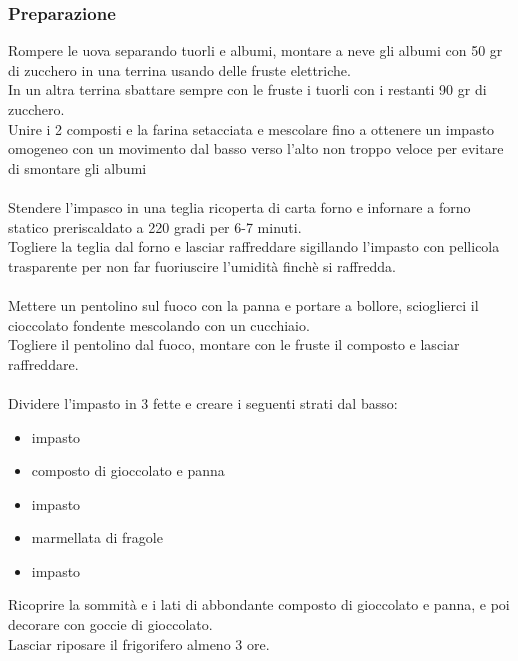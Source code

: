 \documentclass[12pt, a4paper]{article}
\begin{document}
\subsubsection{Preparazione}
	Rompere le uova separando tuorli e albumi, montare a neve gli albumi
	con 50 gr di zucchero in una terrina usando delle fruste elettriche.\\
	In un altra terrina sbattare sempre con le fruste i tuorli con i restanti
	90 gr di zucchero.\\
	Unire i 2 composti e la farina setacciata e mescolare fino a ottenere un impasto
	omogeneo con un movimento dal basso verso l'alto non troppo veloce per evitare di
	smontare gli albumi\\\\
	Stendere l'impasco in una teglia ricoperta di carta forno e infornare a forno statico
	preriscaldato a 220 gradi per 6-7 minuti.\\
	Togliere la teglia dal forno e lasciar raffreddare sigillando l'impasto con pellicola
	trasparente per non far fuoriuscire l'umidità finchè si raffredda.\\\\
	Mettere un pentolino sul fuoco con la panna e portare a bollore, scioglierci il cioccolato
	fondente mescolando con un cucchiaio.\\
	Togliere il pentolino dal fuoco, montare con le fruste il composto e lasciar raffreddare.\\\\
	Dividere l'impasto in 3 fette e creare i seguenti strati dal basso:
	\begin{itemize}
	\item	impasto
	\item   composto di gioccolato e panna
	\item   impasto
	\item   marmellata di fragole
	\item   impasto
	\end{itemize}
	Ricoprire la sommità e i lati di abbondante composto di gioccolato e panna, e poi decorare con
	goccie di gioccolato.\\
	Lasciar riposare il frigorifero almeno 3 ore.
\clearpage

\clearpage
\end{document}
